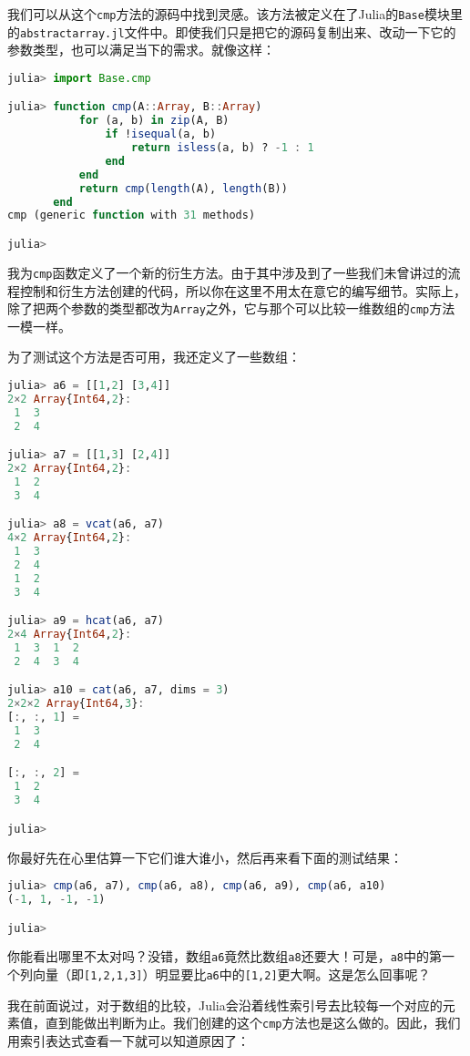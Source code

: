 我们可以从这个\verb`cmp`方法的源码中找到灵感。该方法被定义在了Julia的\verb`Base`模块里的\verb`abstractarray.jl`文件中。即使我们只是把它的源码复制出来、改动一下它的参数类型，也可以满足当下的需求。就像这样：

\begin{lstlisting}[language=julia]
julia> import Base.cmp

julia> function cmp(A::Array, B::Array)
           for (a, b) in zip(A, B)
               if !isequal(a, b)
                   return isless(a, b) ? -1 : 1
               end
           end
           return cmp(length(A), length(B))
       end
cmp (generic function with 31 methods)

julia>
\end{lstlisting}

我为\verb`cmp`函数定义了一个新的衍生方法。由于其中涉及到了一些我们未曾讲过的流程控制和衍生方法创建的代码，所以你在这里不用太在意它的编写细节。实际上，除了把两个参数的类型都改为\verb`Array`之外，它与那个可以比较一维数组的\verb`cmp`方法一模一样。

为了测试这个方法是否可用，我还定义了一些数组：

\begin{lstlisting}[language=julia]
julia> a6 = [[1,2] [3,4]]
2×2 Array{Int64,2}:
 1  3
 2  4

julia> a7 = [[1,3] [2,4]]
2×2 Array{Int64,2}:
 1  2
 3  4

julia> a8 = vcat(a6, a7)
4×2 Array{Int64,2}:
 1  3
 2  4
 1  2
 3  4

julia> a9 = hcat(a6, a7)
2×4 Array{Int64,2}:
 1  3  1  2
 2  4  3  4

julia> a10 = cat(a6, a7, dims = 3)
2×2×2 Array{Int64,3}:
[:, :, 1] =
 1  3
 2  4

[:, :, 2] =
 1  2
 3  4

julia> 
\end{lstlisting}

你最好先在心里估算一下它们谁大谁小，然后再来看下面的测试结果：

\begin{lstlisting}[language=julia]
julia> cmp(a6, a7), cmp(a6, a8), cmp(a6, a9), cmp(a6, a10)
(-1, 1, -1, -1)

julia> 
\end{lstlisting}

你能看出哪里不太对吗？没错，数组\verb`a6`竟然比数组\verb`a8`还要大！可是，\verb`a8`中的第一个列向量（即\verb`[1,2,1,3]`）明显要比\verb`a6`中的\verb`[1,2]`更大啊。这是怎么回事呢？

我在前面说过，对于数组的比较，Julia会沿着线性索引号去比较每一个对应的元素值，直到能做出判断为止。我们创建的这个\verb`cmp`方法也是这么做的。因此，我们用索引表达式查看一下就可以知道原因了：

